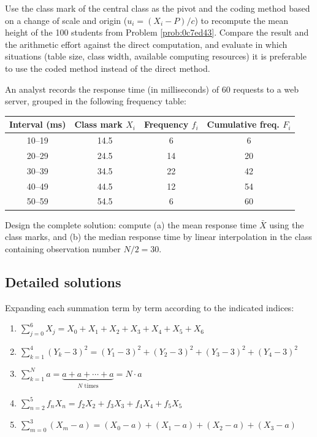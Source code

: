\begin{problema}
	\label{prob:ced3c3b}
	Use the class mark of the central class as the pivot and the coding method based on a change of scale and origin ($u_i = (X_i-P)/c$) to recompute the mean height of the 100 students from Problem \ref{prob:0c7ed43}. Compare the result and the arithmetic effort against the direct computation, and evaluate in which situations (table size, class width, available computing resources) it is preferable to use the coded method instead of the direct method.
\end{problema}

\begin{problema}
	\label{prob:32476e7}
	An analyst records the response time (in milliseconds) of 60 requests to a web server, grouped in the following frequency table:
	\begin{center}
		\begin{tabular}{cccc}
			\hline
			Interval (ms) & Class mark $X_i$ & Frequency $f_i$ & Cumulative freq. $F_i$ \\
			\hline
			10--19 & 14.5 & 6  & 6 \\
			20--29 & 24.5 & 14 & 20 \\
			30--39 & 34.5 & 22 & 42 \\
			40--49 & 44.5 & 12 & 54 \\
			50--59 & 54.5 & 6  & 60 \\
			\hline
		\end{tabular}
	\end{center}
	Design the complete solution: compute (a) the mean response time $\bar{X}$ using the class marks, and (b) the median response time by linear interpolation in the class containing observation number $N/2=30$.
\end{problema}

\subsection*{Detailed solutions}

\begin{solproblema}
	Expanding each summation term by term according to the indicated indices:
	\begin{enumerate}
		\item $\displaystyle\sum_{j=0}^{6}X_{j} = X_{0} + X_{1} + X_{2} + X_{3} + X_{4} + X_{5} + X_{6}$
		\item $\displaystyle\sum_{k=1}^{4}\left( Y_{k}-3 \right)^{2} = (Y_{1}-3)^{2} + (Y_{2}-3)^{2} + (Y_{3}-3)^{2} + (Y_{4}-3)^{2}$
		\item $\displaystyle\sum_{k=1}^{N}a = \underbrace{a + a + \cdots + a}_{N \text{ times}} = N \cdot a$
		\item $\displaystyle\sum_{n=2}^{5}{f_{n}}X_{n} = f_{2}X_{2} + f_{3}X_{3} + f_{4}X_{4} + f_{5}X_{5}$
		\item $\displaystyle\sum_{m=0}^{3}\left( X_{m}-a \right) = (X_{0}-a) + (X_{1}-a) + (X_{2}-a) + (X_{3}-a)$
	\end{enumerate}
\end{solproblema}

